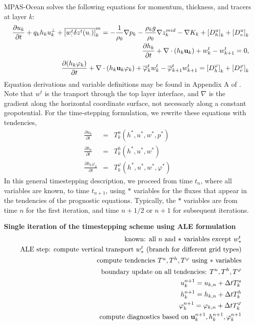 \documentclass[11pt]{report}
\newcommand{\ds}{\displaystyle}
\newcommand{\bea}{\begin{eqnarray}}
\newcommand{\eea}{\end{eqnarray}}
\begin{document}
MPAS-Ocean solves the following equations for momentum, thickness, and tracers at layer $k$:
\begin{eqnarray}   
\label{discrete_momentum1} && \ds
\frac{\partial u_{k}}{\partial t} +  q_{k} h_k u^\perp_{k} 
+ \overline{\left[ w^t_: \delta z^t(u_:)  \right]}^m_k
  = -\frac{1}{\rho_0} \nabla p_{k} 
- \frac{{\rho}_{k} g}{\rho_0}\nabla z^{mid}_{k}
- \nabla K_{k} + \left[D^u_h\right]_k +  \left[D^u_v\right]_k
\\ &&
\label{discrete_thickness1}
\frac{\partial h_{k}}{\partial t} 
+ \nabla \cdot (h_k {\bf u}_k)
+ w^t_k
- w^t_{k+1}
=0,
\\ &&
\label{discrete_tracer1}
\frac{\partial (h_{k}\varphi_{k})}{\partial t} 
+ \nabla \cdot (h_k {\bf u}_k\varphi_k )
+ \overline{\varphi}^t_kw^t_k
- \overline{\varphi}^t_{k+1}w^t_{k+1}
=  \left[D^\varphi_h\right]_k +  \left[D^\varphi_v\right]_k
\end{eqnarray}
Equation derivations and variable definitions may be found in Appendix A of \citet{Ringler_ea13om}.  Note that $w^t$ is the tranport through the top layer interface, and $\nabla$ is the gradient along the horizontal coordinate surface, not necessarly along a constant geopotential.
For the time-stepping formulation, we rewrite these equations with tendencies,
\bea
\label{u1t} \ds
\frac{\partial u_k}{\partial t} &=& T_k^u(h^*, u^*, w^*, p^*) \\
\label{h1t} \ds
\frac{\partial h_k}{\partial t} &=& T_k^h(h^*, u^*, w^*) \\
\label{continuous_tracer1t} \ds
\frac{\partial h_k\varphi_k}{\partial t} &=& T_k^\varphi(h^*, u^*, w^*, \varphi^*)
\eea
In this general timestepping description, we proceed from time $t_n$, where all variables are known, to time $t_{n+1}$, using $*$ variables for the fluxes that appear in the tendencies of the prognostic equations.  Typically, the $*$ variables are from time $n$ for the first iteration, and time $n+1/2$ or $n+1$ for subsequent iterations.

{\bf Single iteration of the timestepping scheme using ALE formulation}
\begin{eqnarray} &&
\mbox{known: all $n$ and $*$ variables except $w^t_*$}\\&&
\mbox{ALE step: compute vertical transport $w^t_*$} 
\mbox{ (branch for different grid types)}\\ && 
\mbox{compute tendencies $T^u, T^h, T^\varphi $ using $*$ variables}\\ && 
\mbox{boundary update on all tendencies: } T^u,T^h,T^\varphi\\&& 
u_{k}^{n+1} = u_{k,n} + \Delta t  T^u_k \\&& 
h_{k}^{n+1} = h_{k,n} + \Delta t T^h_k \\&& 
{\varphi}_{k}^{n+1} =  \varphi_{k,n} + \Delta t  T^\varphi_k \\&&
\mbox{compute diagnostics based on }{\bf u}_{k}^{n+1},h_{k}^{n+1},\varphi_{k}^{n+1} 
\end{eqnarray}
\end{document}
